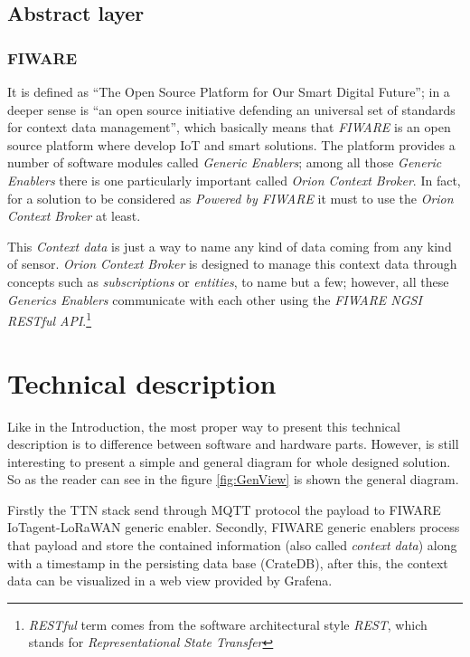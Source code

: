 \documentclass[11pt,a4paper,dvipsnames,twoside]{article}
\begin{document}
\subsection{Abstract layer}

\subsubsection{FIWARE}
It is defined as \enquote{The Open Source Platform for Our Smart Digital Future}\cite{Fiware}; in a deeper sense is \enquote{an open source initiative defending an universal set of standards for context data management}\cite{Fiware}, which basically means that \textit{FIWARE} is an open source platform where develop IoT and smart solutions. The platform provides a number of software modules called \textit{Generic Enablers}; among all those \textit{Generic Enablers} there is one particularly important called \textit{Orion Context Broker}. In fact, for a solution to be considered as \textit{Powered by FIWARE} it must to use the \textit{Orion Context Broker} at least. 

This \textit{Context data} is just a way to name any kind of data coming from any kind of sensor. \textit{Orion Context Broker} is designed to manage this context data through concepts such as \textit{subscriptions} or \textit{entities}, to name but a few; however, all these \textit{Generics Enablers} communicate with each other using the \textit{FIWARE NGSI RESTful API}\cite{NGSI}.\footnote{\textit{RESTful} term comes from the software architectural style \textit{REST}, which stands for \textit{Representational State Transfer}}

\newpage
\section{Technical description}
Like in the Introduction, the most proper way to present this technical description is to difference between software and hardware parts. However, is still interesting to present a simple and general diagram for whole designed solution. So as the reader can see in the figure \ref{fig:GenView} is shown the general diagram. 

Firstly the TTN stack send through MQTT protocol the payload to FIWARE IoTagent-LoRaWAN generic enabler. Secondly, FIWARE generic enablers process that payload and store the contained information (also called \textit{context data}) along with a timestamp in the persisting data base (CrateDB), after this, the context data can be visualized in a web view provided by Grafena. 
\end{document}
